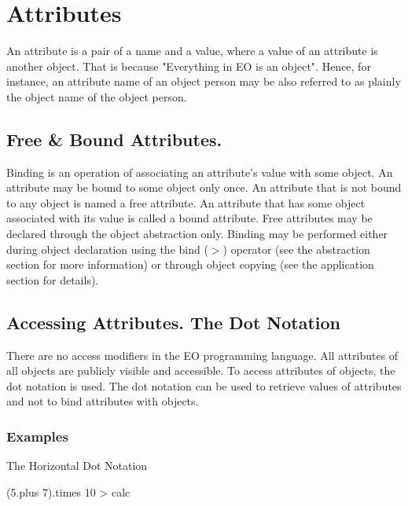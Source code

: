 \documentclass[12pt]{book}
\begin{document}

\section{Attributes}
An attribute is a pair of a name and a value, where a value of an attribute is another object. That is because "Everything in EO is an object". Hence, for instance, an attribute name of an object person may be also referred to as plainly the object name of the object person.

\subsection{Free \& Bound Attributes.}
Binding is an operation of associating an attribute's value with some object. An attribute may be bound to some object only once.
An attribute that is not bound to any object is named a free attribute. An attribute that has some object associated with its value is called a bound attribute.
Free attributes may be declared through the object abstraction only. Binding may be performed either during object declaration using the bind ($>$) operator (see the abstraction section for more information) or through object copying (see the application section for details).

\subsection{Accessing Attributes. The Dot Notation}
There are no access modifiers in the EO programming language. All attributes of all objects are publicly visible and accessible. To access attributes of objects, the dot notation is used. The dot notation can be used to retrieve values of attributes and not to bind attributes with objects.

\subsubsection{Examples}

The Horizontal Dot Notation
\begin{ffcode}
(5.plus 7).times 10 > calc
\end{ffcode}
\end{document}
